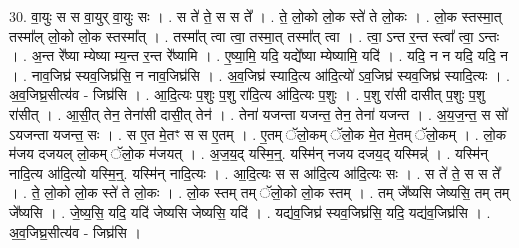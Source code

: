 \documentclass[17pt]{extarticle}
\begin{document}
30. वा॒युः स स वा॒युर् वा॒युः सः । . स ते॑ ते॒ स स ते᳚ । . ते॒ लो॒को लो॒क स्ते॑ ते लो॒कः । . लो॒क स्तस्मा॒त् तस्मा᳚ल् लो॒को लो॒क स्तस्मा᳚त् । . तस्मा᳚त् त्वा त्वा॒ तस्मा॒त् तस्मा᳚त् त्वा । . त्वा॒ ऽन्त र॒न्त स्त्वा᳚ त्वा॒ ऽन्तः । . अ॒न्त रे᳚ष्या म्येष्या म्य॒न्त र॒न्त रे᳚ष्यामि । . ए॒ष्या॒मि॒ यदि॒ यद्ये᳚ष्या म्येष्यामि॒ यदि॑ । . यदि॒ न न यदि॒ यदि॒ न । . नाव॒जिघ्र॑ स्यव॒जिघ्र॑सि॒ न नाव॒जिघ्र॑सि । . अ॒व॒जिघ्र॑ स्यादि॒त्य आ॑दि॒त्यो॑ ऽव॒जिघ्र॑ स्यव॒जिघ्र॑ स्यादि॒त्यः । . अ॒व॒जिघ्र॒सीत्य॑व - जिघ्र॑सि । . आ॒दि॒त्यः प॒शुः प॒शु रा॑दि॒त्य आ॑दि॒त्यः प॒शुः । . प॒शु रा॑सी दासीत् प॒शुः प॒शु रा॑सीत् । . आ॒सी॒त् तेन॒ तेना॑सी दासी॒त् तेन॑ । . तेना॑ यजन्ता यजन्त॒ तेन॒ तेना॑ यजन्त । . अ॒य॒ज॒न्त॒ स सो॑ ऽयजन्ता यजन्त॒ सः । . स ए॒त मे॒तꣳ स स ए॒तम् । . ए॒तम् ॅलो॒कम् ॅलो॒क मे॒त मे॒तम् ॅलो॒कम् । . लो॒क म॑जय दजयल् लो॒कम् ॅलो॒क म॑जयत् । . अ॒ज॒य॒द् यस्मि॒न्॒. यस्मि॑न् नजय दजय॒द् यस्मिन्न्॑ । . यस्मि॑न् नादि॒त्य आ॑दि॒त्यो यस्मि॒न्॒. यस्मि॑न् नादि॒त्यः । . आ॒दि॒त्यः स स आ॑दि॒त्य आ॑दि॒त्यः सः । . स ते॑ ते॒ स स ते᳚ । . ते॒ लो॒को लो॒क स्ते॑ ते लो॒कः । . लो॒क स्तम् तम् ॅलो॒को लो॒क स्तम् । . तम् जे᳚ष्यसि जेष्यसि॒ तम् तम् जे᳚ष्यसि । . जे॒ष्य॒सि॒ यदि॒ यदि॑ जेष्यसि जेष्यसि॒ यदि॑ । . यद्य॑व॒जिघ्र॑ स्यव॒जिघ्र॑सि॒ यदि॒ यद्य॑व॒जिघ्र॑सि । . अ॒व॒जिघ्र॒सीत्य॑व - जिघ्र॑सि । \newline
\end{document}
